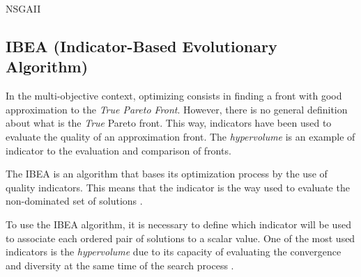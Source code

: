 \begin{algorithm}[htb!]
	\begin{algorithmic}[1]
		\EndWhile
			\EndWhile
			
		\EndWhile
	\end{algorithmic}
	\caption{NSGAII}
	\label{alg:nsgaII}
\end{algorithm}


\subsection{IBEA (Indicator-Based Evolutionary Algorithm)}


In the multi-objective context, optimizing consists in finding a front with good approximation to the \textit{True Pareto Front}. However, there is no general definition about what is the \textit{True} Pareto front. This way, indicators have been used to evaluate the quality of an approximation front. The \textit{hypervolume} is an example of indicator to the evaluation and comparison of fronts.


The IBEA is an algorithm that bases its optimization process by the use of quality indicators. This means that the indicator is the way used to evaluate the non-dominated set of solutions \cite{figueiredo2013algoritmo}.


To use the IBEA algorithm, it is necessary to define which indicator will be used to associate each ordered pair of solutions to a scalar value. One of the most used indicators is the \textit{hypervolume} due to its capacity of evaluating the convergence and diversity at the same time of the search process \cite{ishibuchi2008evolutionary}.


